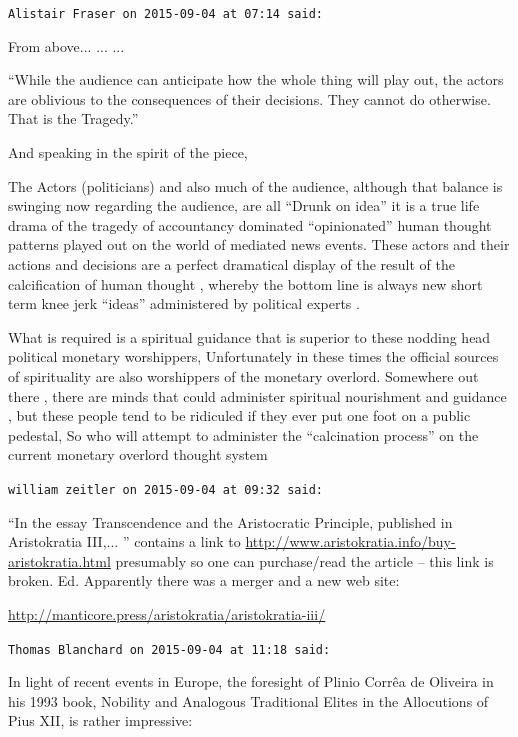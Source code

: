 \begin{footnotesize}
\begin{sffamily}
\texttt{Alistair Fraser on 2015-09-04 at 07:14 said:}

From above... ... ... 

``While the audience can anticipate how the whole thing will play out, the actors are oblivious to the consequences of their decisions. They cannot do otherwise. That is the Tragedy.''

And speaking in the spirit of the piece,

The Actors (politicians) and also much of the audience, although that balance is swinging now regarding the audience, are all ``Drunk on idea'' it is a true life drama of the tragedy of accountancy dominated ``opinionated'' human thought patterns played out on the world of mediated news events. These actors and their actions and decisions are a perfect dramatical display of the result of the calcification of human thought , whereby the bottom line is always new short term knee jerk ``ideas'' administered by political experts .

What is required is a spiritual guidance that is superior to these nodding head political monetary worshippers, Unfortunately in these times the official sources of spirituality are also worshippers of the monetary overlord. Somewhere out there , there are minds that could administer spiritual nourishment and guidance , but these people tend to be ridiculed if they ever put one foot on a public pedestal, So who will attempt to administer the ``calcination process'' on the current monetary overlord thought system

\hfill

\texttt{william zeitler on 2015-09-04 at 09:32 said:}

``In the essay Transcendence and the Aristocratic Principle, published in Aristokratia III,... '' contains a link to \url{http://www.aristokratia.info/buy-aristokratia.html} presumably so one can purchase/read the article -- this link is broken. Ed. Apparently there was a merger and a new web site:

\url{http://manticore.press/aristokratia/aristokratia-iii/}

\hfill

\texttt{Thomas Blanchard on 2015-09-04 at 11:18 said:}

In light of recent events in Europe, the foresight of Plinio Corrêa de Oliveira in his 1993 book, Nobility and Analogous Traditional Elites in the Allocutions of Pius XII, is rather impressive:


\end{sffamily}
\end{footnotesize}
